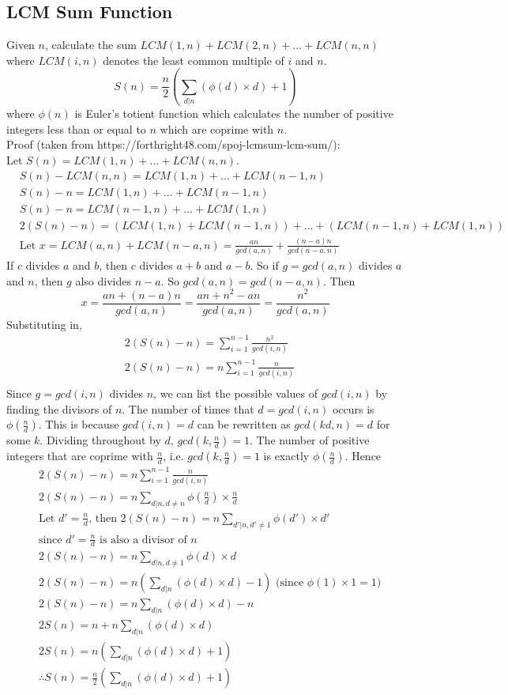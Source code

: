 \documentclass[12pt]{extarticle}
\begin{document}
\subsection*{LCM Sum Function}
Given $n$, calculate the sum $LCM(1,n)+LCM(2,n)+\dots+LCM(n,n)$ where $LCM(i,n)$ denotes the least common multiple of $i$ and $n$.
$$S(n)=\frac{n}{2}(\sum_{d|n}(\phi(d)\times d)+1)$$ where $\phi(n)$ is Euler's totient function which calculates the number of positive integers less than or equal to $n$ which are coprime with $n$.\\
Proof (taken from https://forthright48.com/spoj-lcmsum-lcm-sum/): \\
Let $S(n)=LCM(1,n)+\dots+LCM(n,n)$.
\begin{align*}
&S(n)-LCM(n,n)=LCM(1,n)+\dots+LCM(n-1,n) \\
&S(n)-n=LCM(1,n)+\dots+LCM(n-1,n)\\
&S(n)-n=LCM(n-1,n)+\dots+LCM(1,n)\\
&2(S(n)-n)=(LCM(1,n)+LCM(n-1,n))+\dots+(LCM(n-1,n)+LCM(1,n))\\
&\text{Let }x=LCM(a,n)+LCM(n-a,n)=\frac{an}{gcd(a,n)}+\frac{(n-a)n}{gcd(n-a,n)}
\end{align*}
If $c$ divides $a$ and $b$, then $c$ divides $a+b$ and $a-b$. So if $g=gcd(a,n)$ divides $a$ and $n$, then $g$ also divides $n-a$. So $gcd(a,n)=gcd(n-a,n)$. Then $$x=\frac{an+(n-a)n}{gcd(a,n)}=\frac{an+n^{2}-an}{gcd(a,n)}=\frac{n^{2}}{gcd(a,n)}$$
Substituting in, 
\begin{align*}
&2(S(n)-n)=\sum_{i=1}^{n-1}\frac{n^{2}}{gcd(i,n)}\\
&2(S(n)-n)=n\sum_{i=1}^{n-1}\frac{n}{gcd(i,n)}\\
\end{align*}
Since $g=gcd(i,n)$ divides $n$, we can list the possible values of $gcd(i,n)$ by finding the divisors of $n$. The number of times that $d=gcd(i,n)$ occurs is $\phi(\frac{n}{d})$. This is because $gcd(i,n)=d$ can be rewritten as $gcd(kd,n)=d$ for some $k$. Dividing throughout by $d$, $gcd(k,\frac{n}{d})=1$. The number of positive integers that are coprime with $\frac{n}{d}$, i.e. $gcd(k, \frac{n}{d})=1$ is exactly $\phi(\frac{n}{d})$. Hence
\begin{align*}
&2(S(n)-n)=n\sum_{i=1}^{n-1}\frac{n}{gcd(i,n)}\\
&2(S(n)-n)=n\sum_{d|n,d\not=n}\phi(\frac{n}{d})\times\frac{n}{d}\\
&\text{Let $d'=\frac{n}{d}$, then } 2(S(n)-n)=n\sum_{d'|n,d'\not=1}\phi(d')\times d'\\
&\text{since $d'=\frac{n}{d}$ is also a divisor of }n\\
&2(S(n)-n)=n\sum_{d|n,d\not=1}\phi(d)\times d\\
&2(S(n)-n)=n(\sum_{d|n}(\phi(d)\times d)-1) \text{ (since $\phi(1)\times1=1$)}\\
&2(S(n)-n)=n\sum_{d|n}(\phi(d)\times d)-n\\
&2S(n)=n+n\sum_{d|n}(\phi(d)\times d)\\
&2S(n)=n(\sum_{d|n}(\phi(d)\times d)+1)\\
&\therefore S(n)=\frac{n}{2}(\sum_{d|n}(\phi(d)\times d)+1)
\end{align*}
\end{document}
